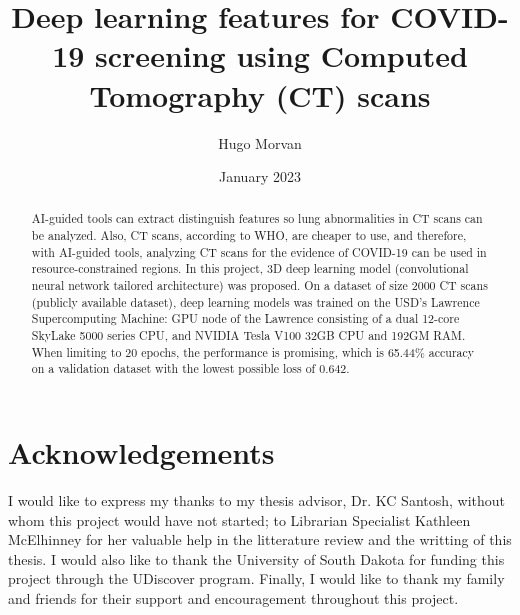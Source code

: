 \documentclass[12pt, letterpaper]{article}
\title{Deep learning features for COVID-19 screening using Computed Tomography (CT)
scans}
\author{Hugo Morvan}
\date{January 2023}
\begin{document}
\maketitle

\begin{abstract}
AI-guided tools can extract distinguish features so lung abnormalities in CT scans can be analyzed. Also, CT scans, according to WHO, are cheaper to use, and therefore, with AI-guided tools, analyzing CT scans for the evidence of COVID-19 can be used in resource-constrained regions. 
In this project, 3D deep learning model (convolutional neural network tailored architecture) was proposed. On a dataset of size 2000 CT scans (publicly available dataset), deep learning models was trained on the USD’s Lawrence Supercomputing Machine: GPU node of the Lawrence consisting of a dual 12-core SkyLake 5000 series CPU, and NVIDIA Tesla V100 32GB CPU and 192GM RAM. 
When limiting to 20 epochs, the performance is promising, which is 65.44\% accuracy on a validation dataset with the lowest possible loss of 0.642.




\end{abstract}

\newpage
\section{Acknowledgements}

I would like to express my thanks to my thesis advisor, Dr. KC Santosh, without whom this project would have not started; to Librarian Specialist Kathleen McElhinney for her valuable help in the litterature review and the writting of this thesis. I would also like to thank the University of South Dakota for funding this project through the UDiscover program. Finally, I would like to thank my family and friends for their support and encouragement throughout this project.

\newpage
\tableofcontents

\newpage
\end{document}
